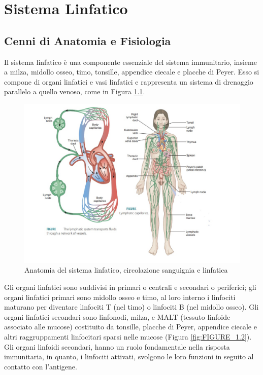 \chapter{Sistema Linfatico}

\section{Cenni di Anatomia e Fisiologia}
Il sistema linfatico \`e una componente essenziale del sistema immunitario, 
insieme a milza, midollo osseo, timo, tonsille, appendice ciecale e placche di Peyer. 
Esso si compone di organi linfatici e vasi linfatici e rappresenta 
un sistema di drenaggio parallelo a quello venoso\cite{BOOK1}, come in Figura \ref{fig:FIGURE_1.1}.\\

\begin{figure}[H]
    \begin{center}
    \includegraphics[width=0.9\columnwidth]{img/ANATOMY2.jpeg}
    \end{center}
    \caption{Anatomia del sistema linfatico, circolazione sanguignia e linfatica
    \cite{img1}}
    \label{fig:FIGURE_1.1}
\end{figure}


Gli organi linfatici sono suddivisi in primari o centrali 
e secondari o periferici; gli organi linfatici primari sono midollo osseo 
e timo, al loro interno i linfociti maturano per diventare linfociti T (nel timo) 
o linfociti B (nel midollo osseo). 
Gli organi linfatici secondari sono linfonodi, milza, e MALT 
(tessuto linfoide associato alle mucose) costituito da tonsille, 
placche di Peyer, appendice ciecale e altri raggruppamenti linfocitari 
sparsi nelle mucose (Figura \ref{fig:FIGURE_1.2}). Gli organi linfoidi secondari, hanno un ruolo fondamentale 
nella risposta immunitaria, in quanto, i linfociti attivati, svolgono le loro funzioni 
in seguito al contatto con l'antigene\cite{BOOK1}.\\


